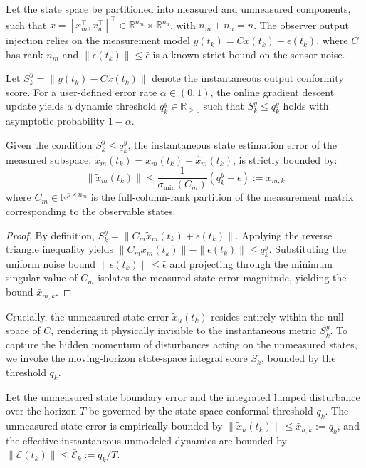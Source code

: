 \documentclass[letterpaper, 10 pt, conference]{ieeeconf}  %
\begin{document}
Let the state space be partitioned into measured and unmeasured components, such that $x = [x_m^\top, x_u^\top]^\top \in \mathbb{R}^{n_m} \times \mathbb{R}^{n_u}$, with $n_m + n_u = n$. The observer output injection relies on the measurement model $y(t_k) = C x(t_k) + \epsilon(t_k)$, where $C$ has rank $n_m$ and $\|\epsilon(t_k)\| \le \bar{\epsilon}$ is a known strict bound on the sensor noise.

\begin{definition}
Let $S^y_k = \|y(t_k) - C\hat{x}(t_k)\|$ denote the instantaneous output conformity score. For a user-defined error rate $\alpha \in (0,1)$, the online gradient descent update yields a dynamic threshold $q^y_k \in \mathbb{R}_{\ge 0}$ such that $S^y_k \le q^y_k$ holds with asymptotic probability $1-\alpha$.
\end{definition}

\begin{lemma}
Given the condition $S^y_k \le q^y_k$, the instantaneous state estimation error of the measured subspace, $\tilde{x}_m(t_k) = x_m(t_k) - \hat{x}_m(t_k)$, is strictly bounded by:
\begin{equation}
    \|\tilde{x}_m(t_k)\| \le \frac{1}{\sigma_{\min}(C_m)} \left( q^y_k + \bar{\epsilon} \right) := \bar{x}_{m,k}
\end{equation}
where $C_m \in \mathbb{R}^{p \times n_m}$ is the full-column-rank partition of the measurement matrix corresponding to the observable states.
\end{lemma}
\begin{proof}
By definition, $S^y_k = \|C_m \tilde{x}_m(t_k) + \epsilon(t_k)\|$. Applying the reverse triangle inequality yields $\|C_m \tilde{x}_m(t_k)\| - \|\epsilon(t_k)\| \le q^y_k$. Substituting the uniform noise bound $\|\epsilon(t_k)\| \le \bar{\epsilon}$ and projecting through the minimum singular value of $C_m$ isolates the measured state error magnitude, yielding the bound $\bar{x}_{m,k}$.
\end{proof}

Crucially, the unmeasured state error $\tilde{x}_u(t_k)$ resides entirely within the null space of $C$, rendering it physically invisible to the instantaneous metric $S^y_k$. To capture the hidden momentum of disturbances acting on the unmeasured states, we invoke the moving-horizon state-space integral score $S_k$, bounded by the threshold $q_k$. 

\begin{lemma}
Let the unmeasured state boundary error and the integrated lumped disturbance over the horizon $T$ be governed by the state-space conformal threshold $q_k$. The unmeasured state error is empirically bounded by $\|\tilde{x}_u(t_k)\| \le \bar{x}_{u,k} := q_k$, and the effective instantaneous unmodeled dynamics are bounded by $\|\mathcal{E}(t_k)\| \le \bar{\mathcal{E}}_k := q_k / T$.
\end{lemma}
\end{document}
